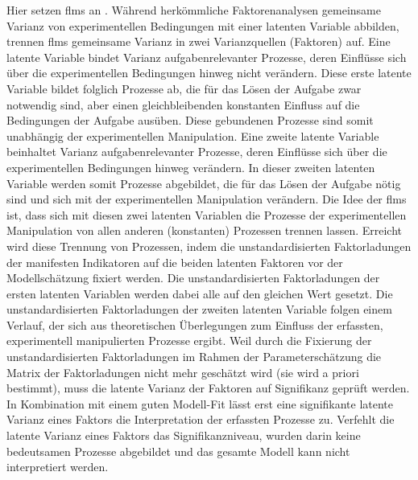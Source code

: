 \documentclass[11pt, twoside, a4paper]{book}		%
\begin{document}
Hier setzen \glspl{flm} an \citep{Schweizer2006a, Schweizer2006b}. Während herkömmliche Faktorenanalysen gemeinsame Varianz von experimentellen Bedingungen mit einer latenten Variable abbilden, trennen \glspl{flm} gemeinsame Varianz in zwei Varianzquellen (Faktoren) auf. 
Eine latente Variable bindet Varianz aufgabenrelevanter Prozesse, deren Einflüsse sich über die experimentellen Bedingungen hinweg nicht verändern. Diese erste latente Variable bildet folglich Prozesse ab, die für das Lösen der Aufgabe zwar notwendig sind, aber einen gleichbleibenden konstanten Einfluss auf die Bedingungen der Aufgabe ausüben. Diese gebundenen Prozesse sind somit unabhängig der experimentellen Manipulation.
Eine zweite latente Variable beinhaltet Varianz aufgabenrelevanter Prozesse, deren Einflüsse sich über die experimentellen Bedingungen hinweg verändern. In dieser zweiten latenten Variable werden somit Prozesse abgebildet, die für das Lösen der Aufgabe nötig sind und sich mit der experimentellen Manipulation verändern. Die Idee der \glspl{flm} ist, dass sich mit diesen zwei latenten Variablen die Prozesse der experimentellen Manipulation von allen anderen (konstanten) Prozessen trennen lassen.
Erreicht wird diese Trennung von Prozessen, indem die unstandardisierten Faktorladungen der manifesten Indikatoren auf die beiden latenten Faktoren vor der Modellschätzung fixiert werden. Die unstandardisierten Faktorladungen der ersten latenten Variablen werden dabei alle auf den gleichen Wert gesetzt. Die unstandardisierten Faktorladungen der zweiten latenten Variable folgen einem Verlauf, der sich aus theoretischen Überlegungen zum Einfluss der erfassten, experimentell manipulierten Prozesse ergibt. 
Weil durch die Fixierung der unstandardisierten Faktorladungen im Rahmen der Parameterschätzung die Matrix der Faktorladungen nicht mehr geschätzt wird (sie wird a priori bestimmt), muss die latente Varianz der Faktoren auf Signifikanz geprüft werden. In Kombination mit einem guten Modell-Fit lässt erst eine signifikante latente Varianz eines Faktors die Interpretation der erfassten Prozesse zu. Verfehlt die latente Varianz eines Faktors das Signifikanzniveau, wurden darin keine bedeutsamen Prozesse abgebildet und das gesamte Modell kann nicht interpretiert werden.
\end{document}
